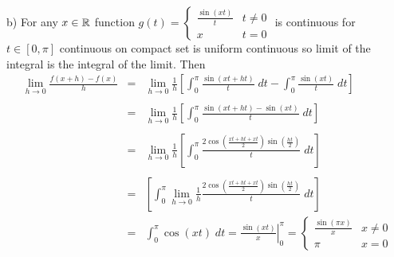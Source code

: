 \begin{problem}
\begin{solution}
    b) For any $x\in \mathbb{R}$ function $g(t) = \begin{cases}
        \frac{\sin(xt)}{t} & t\ne 0 \\ 
        x & t=0\end{cases} $
    is  continuous for $t\in [0,\pi]$ continuous on compact set is uniform continuous so limit of the integral is the integral of the limit. Then 
    \[\begin{array}{rcl}
    \displaystyle \lim_{h\to 0} \frac{f(x+h)-f(x)}{h}&=&\displaystyle \lim_{h\to 0} \frac{1}h \left[\int_0^\pi \frac{\sin(xt+ht)}{t}\; dt - \int_0^\pi \frac{\sin(xt)}{t}\; dt \right]\\ \\ 
    &=&\displaystyle \lim_{h\to 0} \frac{1}h \left[\int_0^\pi \frac{\sin(xt+ht)-\sin(xt)}{t}\; dt  \right]\\ \\ 
    &=&\displaystyle \lim_{h\to 0} \frac{1}h \left[\int_0^\pi \frac{2\cos\left(\frac{xt+ht+xt}{2}\right)\sin\left(\frac{ht}{2}\right)}{t}\; dt  \right]
    \\ \\ 
    &=&\displaystyle  \left[\int_0^\pi \lim_{h\to 0} \frac{1}h \frac{2\cos\left(\frac{xt+ht+xt}{2}\right)\sin\left(\frac{ht}{2}\right)}{t}\; dt  \right] \\ 
    &=& \displaystyle \int_0^\pi \cos(xt)\; dt = \left.\frac{\sin(xt)}{x}\right|_0^\pi = \begin{cases}
        \frac{\sin(\pi x)}{x} & x \ne 0 \\ \pi & x = 0 
    \end{cases}
    \end{array}\]
\end{solution}
\end{problem}


